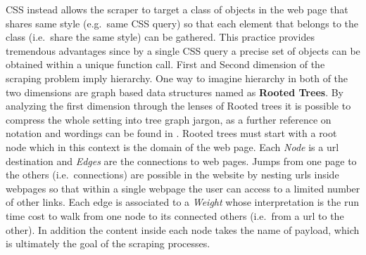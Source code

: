 \documentclass[
  12pt,
  a4paper,
  oneside]{book}
\theoremstyle{definition}
\theoremstyle{definition}
\theoremstyle{definition}
\theoremstyle{remark}
\begin{document}
CSS instead allows the scraper to target a class of objects in the web page that shares same style (e.g.~same CSS query) so that each element that belongs to the class (i.e.~share the same style) can be gathered. This practice provides tremendous advantages since by a single CSS query a precise set of objects can be obtained within a unique function call.
First and Second dimension of the scraping problem imply hierarchy. One way to imagine hierarchy in both of the two dimensions are graph based data structures named as \textbf{Rooted Trees}. By analyzing the first dimension through the lenses of Rooted trees it is possible to compress the whole setting into tree graph jargon, as a further reference on notation and wordings can be found in \citet{Graph_Diestel}. Rooted trees must start with a root node which in this context is the domain of the web page. Each \emph{Node} is a url destination and \emph{Edges} are the connections to web pages. Jumps from one page to the others (i.e.~connections) are possible in the website by nesting urls inside webpages so that within a single webpage the user can access to a limited number of other links. Each edge is associated to a \emph{Weight} whose interpretation is the run time cost to walk from one node to its connected others (i.e.~from a url to the other). In addition the content inside each node takes the name of payload, which is ultimately the goal of the scraping processes.
\end{document}

